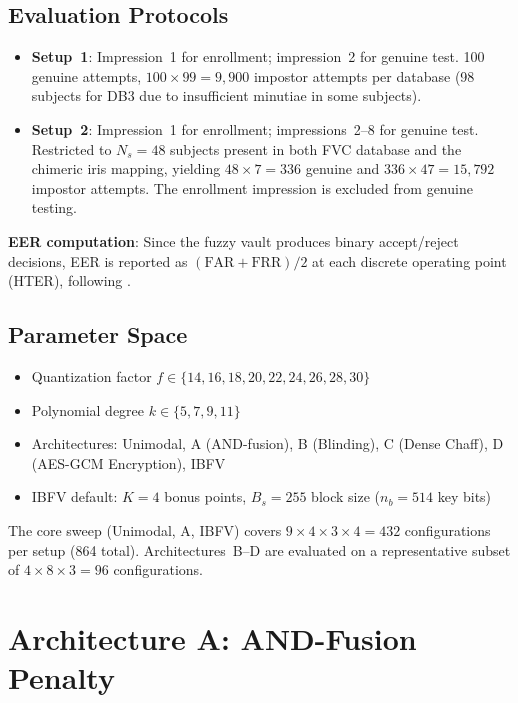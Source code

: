 \subsection{Evaluation Protocols}

\begin{itemize}
  \item \textbf{Setup~1}: Impression~1 for enrollment; impression~2 for genuine
  test. 100 genuine attempts, $100 \times 99 = 9{,}900$ impostor attempts per
  database (98 subjects for DB3 due to insufficient minutiae in some subjects).
  \item \textbf{Setup~2}: Impression~1 for enrollment; impressions~2--8 for genuine
  test. Restricted to $N_s = 48$ subjects present in both FVC database and the
  chimeric iris mapping, yielding $48 \times 7 = 336$ genuine and
  $336 \times 47 = 15{,}792$ impostor attempts. The enrollment impression is
  excluded from genuine testing.
\end{itemize}

\noindent \textbf{EER computation}: Since the fuzzy vault produces binary
accept/reject decisions, EER is reported as $(\text{FAR}+\text{FRR})/2$ at each
discrete operating point (HTER), following \cite{nandakumar2007fuzzy,maurya2025enhancing}.

\subsection{Parameter Space}

\begin{itemize}
  \item Quantization factor $f \in \{14, 16, 18, 20, 22, 24, 26, 28, 30\}$
  \item Polynomial degree $k \in \{5, 7, 9, 11\}$
  \item Architectures: Unimodal, A (AND-fusion), B (Blinding), C (Dense Chaff),
  D (AES-GCM Encryption), IBFV
  \item IBFV default: $K = 4$ bonus points, $B_s = 255$ block size ($n_b = 514$ key bits)
\end{itemize}

The core sweep (Unimodal, A, IBFV) covers $9 \times 4 \times 3 \times 4 = 432$
configurations per setup (864 total). Architectures~B--D are evaluated on a
representative subset of $4 \times 8 \times 3 = 96$ configurations.

\section{Architecture A: AND-Fusion Penalty}
\label{sec:arch_a_results}

